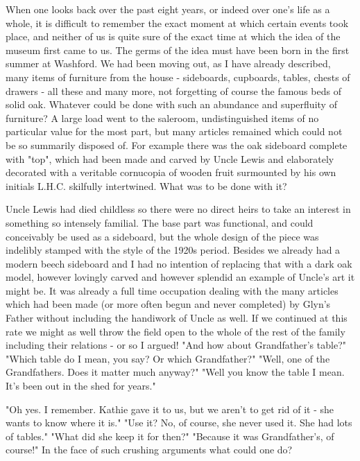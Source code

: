 
When one looks back over the past eight years, or indeed over one's life as a whole, it is difficult to remember the exact moment at which certain events took place, and neither of us is quite sure of the exact time at which the idea of the museum first came to us. The germs of the idea must have been born in the first summer at Washford. We had been moving out, as I have already described, many items of furniture from the house - sideboards, cupboards, tables, chests of drawers - all these and many more, not forgetting of course the famous beds of solid oak. Whatever could be done with such an abundance and superfluity of furniture? A large load went to the saleroom, undistinguished items of no particular value for the most part, but many articles remained which could not be so summarily disposed of. For example there was the oak sideboard complete with "top", which had been made and carved by Uncle Lewis and elaborately decorated with a veritable cornucopia of wooden fruit surmounted by his own initials L.H.C. skilfully intertwined. What was to be done with it?

Uncle Lewis had died childless so there were no direct heirs to take an interest in something so intensely familial. The base part was functional, and could conceivably be used as a sideboard, but the whole design of the piece was indelibly stamped with the style of the 1920s period. Besides we already had a modern beech sideboard and I had no intention of replacing that with a dark oak model, however lovingly carved and however splendid an example of Uncle's art it might be. It was already a full time occupation dealing with the many articles which had been made (or more often begun and never completed) by Glyn's Father without including the handiwork of Uncle as well. If we continued at this rate we might as well throw the field open to the whole of the rest of the family including their relations - or so I argued! "And how about Grandfather's table?" "Which table do I mean, you say? Or which Grandfather?" "Well, one of the Grandfathers. Does it matter much anyway?" "Well you know the table I mean. It's been out in the shed for years."

"Oh yes. I remember. Kathie gave it to us, but we aren't to get rid of it - she wants to know where it is."
"Use it? No, of course, she never used it. She had lots of tables."
"What did she keep it for then?"
"Because it was Grandfather's, of course!"
In the face of such crushing arguments what could one do?

